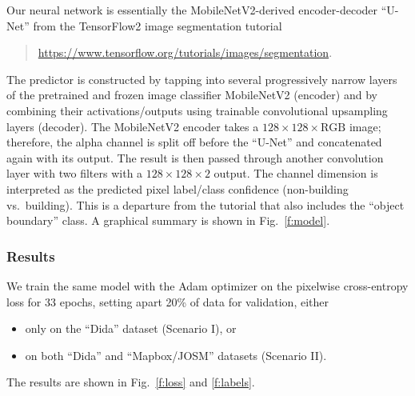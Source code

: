 \documentclass[12pt,a4paper]{article}
\begin{document}
    Our neural network
    is essentially 
    the MobileNetV2-derived
    encoder-decoder ``U-Net''
    from the TensorFlow2 image segmentation tutorial
    \begin{quote}
        \href{https://www.tensorflow.org/tutorials/images/segmentation}{https://www.tensorflow.org/tutorials/images/segmentation}.
    \end{quote}
    The predictor is 
    constructed 
    by tapping into several 
    progressively narrow layers 
    of the pretrained and frozen
    image classifier MobileNetV2 (encoder)
    and
    by combining their activations/outputs using 
    trainable 
    convolutional
    upsampling layers (decoder).
    The MobileNetV2 encoder 
    takes a $128 \times 128 \times \text{RGB}$ image;
    therefore,
    the alpha channel is split off
    before the ``U-Net''
    and 
    concatenated again with its output.
    The result is then passed through another
    convolution layer with two filters
    with a $128 \times 128 \times 2$ output.
    The channel dimension is 
    interpreted as the predicted pixel label/class confidence
    (non-building vs.~building).
    This is a departure from the tutorial
    that also includes the ``object boundary'' class.
    A graphical summary is shown in Fig.~\ref{f:model}.
    
    
    

    \subsubsection*{Results}
    
    We train the same model with the Adam optimizer on 
    the pixelwise cross-entropy loss 
    for 33 epochs,
    setting apart 20\% of data for validation,
    either 
    \begin{itemize}
    \item 
        only on the ``Dida'' dataset (Scenario I), or
    \item
        on both ``Dida'' and ``Mapbox/JOSM'' datasets (Scenario II).
    \end{itemize}
    
    The results are shown in Fig.~\ref{f:loss} and \ref{f:labels}.
    
\end{document}
